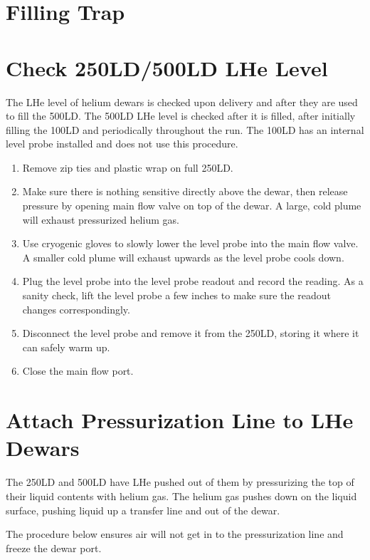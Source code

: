 \section{Filling \lnn{} Trap}

\section{Check 250LD/500LD LHe Level}
\label{procedure:check-lhe-level}
The LHe level of helium dewars is checked upon delivery and after they are used to fill the 500LD. The 500LD LHe level is checked after it is filled, after initially filling the 100LD and periodically throughout the run. The 100LD has an internal level probe installed and does not use this procedure.

\begin{enumerate}
 \item Remove zip ties and plastic wrap on full 250LD.
 \item Make sure there is nothing sensitive directly above the dewar, then release pressure by opening main flow valve on top of the dewar. A large, cold plume will exhaust pressurized helium gas.
 \item Use cryogenic gloves to slowly lower the level probe into the main flow valve. A smaller cold plume will exhaust upwards as the level probe cools down.
 \item Plug the level probe into the level probe readout and record the reading. As a sanity check, lift the level probe a few inches to make sure the readout changes correspondingly.
 \item Disconnect the level probe and remove it from the 250LD, storing it where it can safely warm up.
 \item Close the main flow port.
\end{enumerate}

\section{Attach Pressurization Line to LHe Dewars}
\label{procedure:attach-pressurization-line}

The 250LD and 500LD have LHe pushed out of them by pressurizing the top of their liquid contents with helium gas.  The helium gas pushes down on the liquid surface, pushing liquid up a transfer line and out of the dewar.

The procedure below ensures air will not get in to the pressurization line and freeze the dewar port.

